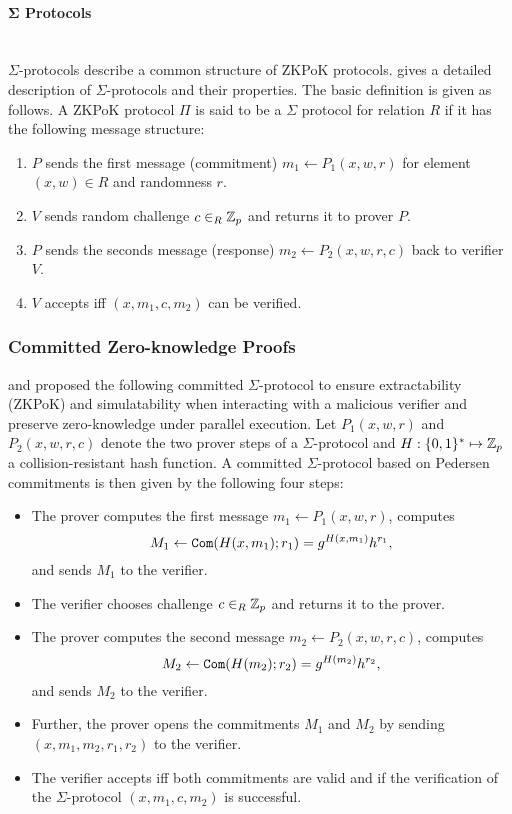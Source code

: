 \paragraph{$\bm{\Sigma}$ Protocols}\hfill\\
$\Sigma$-protocols describe a common structure of \ac{ZKPoK} protocols.
\citet{Damgard10} gives a detailed description of $\Sigma$-protocols and their properties.
The basic definition is given as follows.
A \ac{ZKPoK} protocol $\Pi$ is said to be a $\Sigma$ protocol for relation $R$ if it has the following message structure:
\begin{enumerate}
  \item $P$ sends the first message (commitment) $m_1\gets P_1(x,w,r)$ for element $(x,w)\in R$ and randomness $r$.
  \item $V$ sends random challenge $c\in_R\mathbb{Z}_p$ and returns it to prover $P$.
  \item $P$ sends the seconds message (response) $m_2\gets P_2(x,w,r,c)$ back to verifier $V$.
  \item $V$ accepts iff $(x,m_1,c,m_2)$ can be verified.
\end{enumerate}


\subsubsection{Committed Zero-knowledge Proofs} \label{sec:commited-sigma}
\citet{Damgard00} and \citet{JareckiL00} proposed the following committed $\Sigma$-protocol to ensure extractability (\ac{ZKPoK}) and simulatability when interacting with a malicious verifier and preserve zero-knowledge under parallel execution.
Let $P_1(x,w,r)$ and $P_2(x,w,r,c)$ denote the two prover steps of a $\Sigma$-protocol and $H:\{0,1\}^\ast\mapsto\mathbb{Z}_p$ a collision-resistant hash function.
A committed $\Sigma$-protocol based on Pedersen commitments is then given by the following four steps:
\begin{itemize}
  \item The prover computes the first message $m_1\gets P_1(x,w,r)$, computes 
  \[M_1\gets\mathtt{Com}(H(x,m_1); r_1)=g^{H(x,m_1)}h^{r_1},\]
  and sends $M_1$ to the verifier.
  \item The verifier chooses challenge $c\in_R\mathbb{Z}_p$ and returns it to the prover.
  \item The prover computes the second message $m_2\gets P_2(x,w,r,c)$, computes 
  \[M_2\gets\mathtt{Com}(H(m_2); r_2)=g^{H(m_2)}h^{r_2},\]
   and sends $M_2$ to the verifier.
  \item Further, the prover opens the commitments $M_1$ and $M_2$ by sending $(x,m_1,m_2,r_1,r_2)$ to the verifier.
  \item The verifier accepts iff both commitments are valid and if the verification of the $\Sigma$-protocol $(x,m_1,c,m_2)$ is successful.
\end{itemize}

